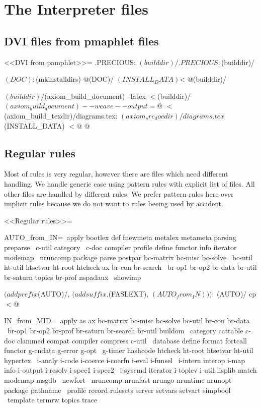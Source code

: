 \documentclass{article}
\begin{document}
\section{The Interpreter files}

\subsection{DVI files from pmaphlet files}
<<DVI from pamphlet>>=
.PRECIOUS: $(builddir)/%
.PRECIOUS: $(builddir)/%

$(DOC):
	$(mkinstalldirs) $@

$(DOC)/%
	$(INSTALL_DATA) $< $@

$(builddir)/%

$(builddir)/%
	$(axiom_build_document) --latex $<

$(builddir)/%
	$(axiom_build_document) --weave --output=$@ $<

$(axiom_build_texdir)/diagrams.tex: $(axiom_src_docdir)/diagrams.tex
	$(INSTALL_DATA) $< $@
@

\subsection{Regular rules}

Most of rules is very regular, however there are files which need
different handling.  We handle generic case using  pattern rules with
explicit list of files.  All other files are handled by different rules.
We prefer pattern rules here over implicit rules because we do not
want to rules beeing used by accident.

<<Regular rules>>=

AUTO_from_IN=\
 apply bootlex def fnewmeta metalex metameta parsing preparse \
 c-util category \
 c-doc compiler profile define functor info iterator modemap \
 nruncomp package parse postpar bc-matrix bc-misc bc-solve \
 bc-util ht-util htsetvar ht-root htcheck ax br-con br-search \
 br-op1 br-op2 br-data br-util br-saturn topics br-prof nspadaux \
 showimp

$(addprefix $(AUTO)/, $(addsuffix .$(FASLEXT), $(AUTO_from_IN))): \
   $(AUTO)/%
	cp $< $@

IN_from_MID=\
 apply as ax bc-matrix bc-misc bc-solve bc-util br-con br-data \
 br-op1 br-op2 br-prof br-saturn br-search br-util buildom \
 category cattable c-doc clammed compat compiler compress c-util \
 database define format fortcall functor g-cndata g-error g-opt \
 g-timer hashcode htcheck ht-root htsetvar ht-util hypertex \
 i-analy i-code i-coerce i-coerfn i-eval i-funsel \
 i-intern interop i-map info i-output i-resolv i-spec1 i-spec2 \
 i-syscmd iterator i-toplev i-util lisplib match modemap msgdb \
 newfort \
 nruncomp nrunfast nrungo nruntime nrunopt package pathname \
 profile record rulesets server setvars setvart simpbool \
 template termrw topics trace
\end{document}
